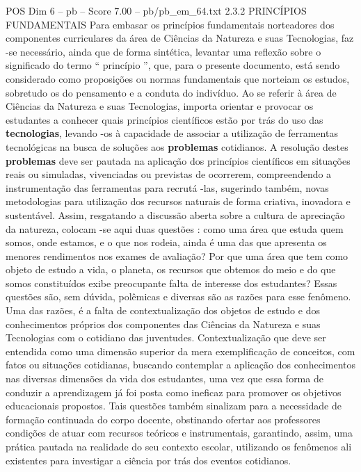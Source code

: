 \begin{textsample}{POS Dim 6 – pb – Score 7.00 – pb/pb\_em\_64.txt}  \label{ex:f6_pos_209}
2.3.2 PRINCÍPIOS FUNDAMENTAIS Para embasar os princípios fundamentais norteadores dos componentes curriculares da área de Ciências da Natureza e suas Tecnologias, faz -se necessário, ainda que de forma sintética, levantar uma reflexão sobre o significado do termo “ princípio ”, que, para o presente documento, está sendo considerado como proposições ou normas fundamentais que norteiam os estudos, sobretudo os do pensamento e a conduta do indivíduo.
Ao se referir à área de Ciências da Natureza e suas Tecnologias, importa orientar e provocar os estudantes a conhecer quais princípios científicos estão por trás do uso das \textbf{tecnologias}, levando -os à capacidade de associar a utilização de ferramentas tecnológicas na busca de soluções aos \textbf{problemas} cotidianos.
A resolução destes \textbf{problemas} deve ser pautada na aplicação dos princípios científicos em situações reais ou simuladas, vivenciadas ou previstas de ocorrerem, compreendendo a instrumentação das ferramentas para recrutá -las, sugerindo também, novas metodologias para utilização dos recursos naturais de forma criativa, inovadora e sustentável.
Assim, resgatando a discussão aberta sobre a cultura de apreciação da natureza, colocam -se aqui duas questões : como uma área que estuda quem somos, onde estamos, e o que nos rodeia, ainda é uma das que apresenta os menores rendimentos nos exames de avaliação?
Por que uma área que tem como objeto de estudo a vida, o planeta, os recursos que obtemos do meio e do que somos constituídos exibe preocupante falta de interesse dos estudantes?
Essas questões são, sem dúvida, polêmicas e diversas são as razões para esse fenômeno.
Uma das razões, é a falta de contextualização dos objetos de estudo e dos conhecimentos próprios dos componentes das Ciências da Natureza e suas Tecnologias com o cotidiano das juventudes.
Contextualização que deve ser entendida como uma dimensão superior da mera exemplificação de conceitos, com fatos ou situações cotidianas, buscando contemplar a aplicação dos conhecimentos nas diversas dimensões da vida dos estudantes, uma vez que essa forma de conduzir a aprendizagem já foi posta como ineficaz para promover os objetivos educacionais propostos.
Tais questões também sinalizam para a necessidade de formação continuada do corpo docente, obstinando ofertar aos professores condições de atuar com recursos teóricos e instrumentais, garantindo, assim, uma prática pautada na realidade do seu contexto escolar, utilizando os fenômenos ali existentes para investigar a ciência por trás dos eventos cotidianos.

\end{textsample}
